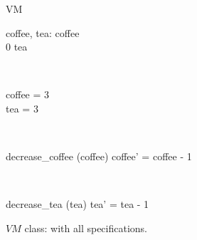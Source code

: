 \begin{figure}[H]
\centering
\begin{class}{VM}
\\
\begin{state}
coffee, tea: \integer
{} \leq  coffee 
\\
0 \leq  tea 
\end{state} 
\\
\begin{init}
coffee = 3
\\tea = 3
\end{init} 
\\
\begin{op}{decrease\_coffee}
\Delta (coffee)
\ST
coffee' = coffee - 1
\end{op}
\\
\begin{op}{decrease\_tea}
\Delta (tea)
\ST
tea' = tea - 1
\end{op}
\end{class}
\caption{$VM$ class: with all specifications.}
\label{oz_vm_with_all_specifications}
\end{figure}